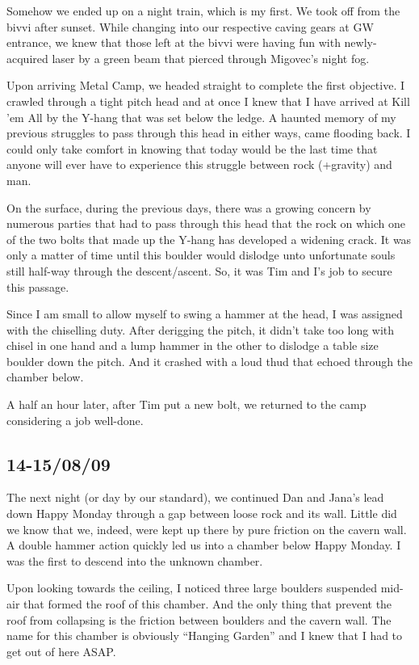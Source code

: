 Somehow we ended up on a night train, which is my first. We took off
from the bivvi after sunset. While changing into our respective caving
gears at GW entrance, we knew that those left at the bivvi were having
fun with newly-acquired laser by a green beam that pierced through
Migovec's night fog.

Upon arriving Metal Camp, we headed straight to complete the first
objective. I crawled through a tight pitch head and at once I knew that
I have arrived at Kill 'em All by the Y-hang that was set below the
ledge. A haunted memory of my previous struggles to pass through this
head in either ways, came flooding back. I could only take comfort in
knowing that today would be the last time that anyone will ever have to
experience this struggle between rock (+gravity) and man.

On the surface, during the previous days, there was a growing concern by
numerous parties that had to pass through this head that the rock on
which one of the two bolts that made up the Y-hang has developed a
widening crack. It was only a matter of time until this boulder would
dislodge unto unfortunate souls still half-way through the
descent/ascent. So, it was Tim and I's job to secure this passage.

Since I am small to allow myself to swing a hammer at the head, I was
assigned with the chiselling duty. After derigging the pitch, it didn't
take too long with chisel in one hand and a lump hammer in the other to
dislodge a table size boulder down the pitch. And it crashed with a loud
thud that echoed through the chamber below.

A half an hour later, after Tim put a new bolt, we returned to the camp
considering a job well-done.


\hypertarget{section-1}{%
\subsection{14-15/08/09}\label{section-1}}

The next night (or day by our standard), we continued Dan and Jana's
lead down Happy Monday through a gap between loose rock and its wall.
Little did we know that we, indeed, were kept up there by pure friction
on the cavern wall. A double hammer action quickly led us into a chamber
below Happy Monday. I was the first to descend into the unknown chamber.

Upon looking towards the ceiling, I noticed three large boulders
suspended mid-air that formed the roof of this chamber. And the only
thing that prevent the roof from collapsing is the friction between
boulders and the cavern wall. The name for this chamber is obviously
``Hanging Garden'' and I knew that I had to get out of here ASAP.

